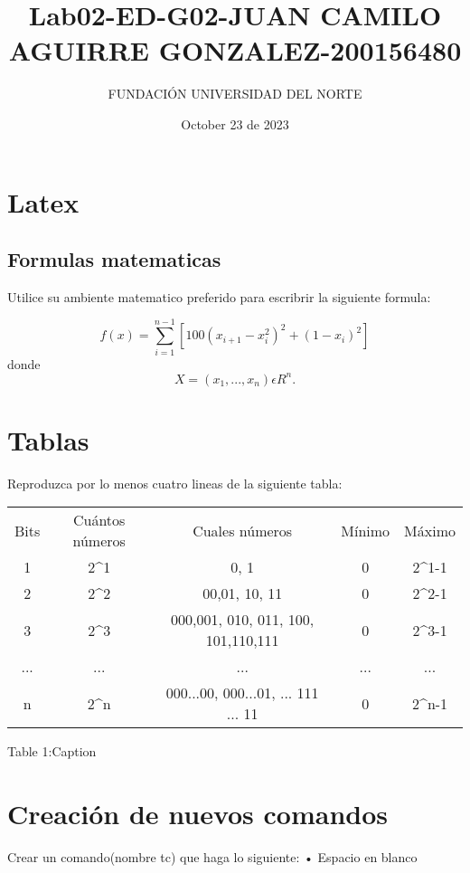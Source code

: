 \documentclass{article}
\title{Lab02-ED-G02-JUAN CAMILO AGUIRRE GONZALEZ-200156480}
\author{FUNDACIÓN UNIVERSIDAD DEL NORTE }
\date{October 23 de 2023}
\begin{document}
\maketitle

\section{Latex}
\subsection{Formulas matematicas}
Utilice su ambiente matematico preferido para escribrir la siguiente formula:

$$f(x)=\sum_{i=1}^{n-1}[100(x_{i+1}-x_{i}^2)^2+(1-x_{i})^2]$$ donde   $$X = (x_{1},...,x_{n})\epsilon  R^n. $$

\section{Tablas}

Reproduzca por lo menos cuatro lineas de la siguiente tabla:

\vspace{0.5cm}



    \begin{tabular}{c|c|c|c|c}
         Bits &  Cuántos números & Cuales números & Mínimo & Máximo\\
         1 & 2^1 & {0, 1} & 0 & 2^{1-1} \\
         2 & 2^2 & {00,01, 10, 11}  & 0 & 2^2-1 \\
         3 & 2^3 & {000,001, 010, 011, 100, 101,110,111} & 0 & 2^3-1  \\
         ... & ... & ... & ... & ... \\
         n & 2^n & {000...00, 000...01, ... 111 ... 11} & 0  & 2^{n-1} \\  
    \end{tabular}

    \hspace{4.5cm}\caption{Table 1:Caption}
    \label{tab:my_label}



    

\newpage
\section{Creación de nuevos comandos}
Crear un comando(nombre tc) que haga lo siguiente:
• Espacio en blanco
\end{document}
